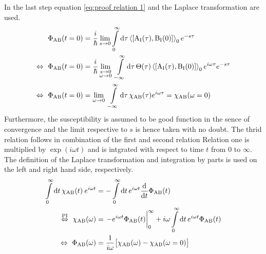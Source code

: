 In the last step equation \eqref{eq:proof relation 1} and the Laplace transformation are used.
%
\begin{align}
	\Phi_{\mt{AB}}(t=0) &= \frac{i}{\hbar} \lim\limits_{s \to 0} \int\limits_{0}^{\infty} \dd{\tau} \expval{\comm{\mt{A}_{\mt{I}}(\tau)}{\mt{B}_{\mt{I}}(0)}}_{0} e^{-s\tau}
	\notag \\
	\Leftrightarrow\ \Phi_{\mt{AB}}(t=0) &= \frac{i}{\hbar} \lim\limits_{\substack{s \to 0 \\ \omega \to 0}}\ \int\limits_{-\infty}^{\infty} \dd{\tau} \Theta(\tau) \expval{\comm{\mt{A}_{\mt{I}}(\tau)}{\mt{B}_{\mt{I}}(0)}}_{0} e^{i\omega \tau} e^{-s\tau}
	\notag \\
	\Leftrightarrow\ \Phi_{\mt{AB}}(t=0) &= \lim\limits_{\omega \to 0}\ \int\limits_{-\infty}^{\infty} \dd{\tau} \chi_{\mt{AB}}(\tau) e^{i\omega \tau} = \chi_{\mt{AB}}(\omega = 0)
\end{align}
%
Furthermore, the susceptibility is assumed to be good function in the sence of convergence and the limit respective to $s$ is hence taken with no doubt.
The thrid relation follows in combination of the first and second relation
Relation one is multiplied by $\exp(i\omega t)$ and is intgrated with respect to time $t$ from $0$ to $\infty$.
The definition of the Laplace transformation and integration by parts is used on the left and right hand side, respectively.
%
\begin{align}
	\int\limits_{0}^{\infty} \dd{t} \chi_{\mt{AB}}(t)\: e^{i\omega t} &= - \int\limits_{0}^{\infty} \dd{t} e^{i\omega t} \dv{t} \Phi_{\mt{AB}}(t)
	\notag \\
	\overset{\mt{PI}}{\Leftrightarrow}\ \chi_{\mt{AB}}(\omega) &= \eval{-e^{i\omega t} \Phi_{\mt{AB}}(t)}_{0}^{\infty} + i\omega \int\limits_{0}^{\infty} \dd{t} e^{i\omega t} \Phi_{\mt{AB}}(t)
	\notag \\
	\Leftrightarrow\ \Phi_{\mt{AB}}(\omega) &= \frac{1}{i\omega} \big[\chi_{\mt{AB}}(\omega) - \chi_{\mt{AB}}(\omega=0)\big]
\end{align}
%

